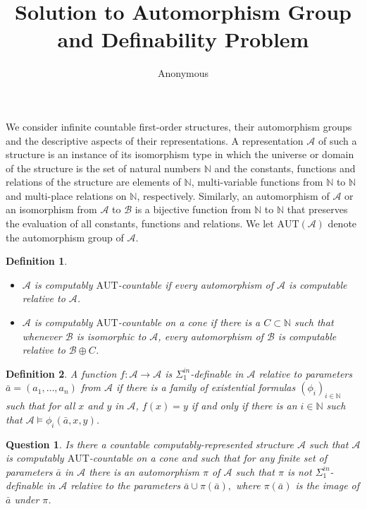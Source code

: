 \documentclass[12pt]{article}
\title{Solution to Automorphism Group and Definability Problem}
\author{Anonymous}
\date{}
\newcommand{\A}{\mathcal{A}}
\newcommand{\B}{\mathcal{B}}
\newcommand{\N}{\mathbb{N}}
\newcommand{\AUT}{\mathrm{AUT}}
\newtheorem{definition}{Definition}
\newtheorem{question}{Question}
\begin{document}
\maketitle

We consider infinite countable first-order structures, their automorphism groups and the descriptive aspects of their representations. A representation $\A$ of such a structure is an instance of its isomorphism type in which the universe or domain of the structure is the set of natural numbers $\N$ and the constants, functions and relations of the structure are elements of $\N$, multi-variable functions from $\N$ to $\N$ and multi-place relations on $\N$, respectively.   Similarly, an automorphism of $\A$ or an isomorphism from $\A$ to $\B$ is a bijective function from $\N$ to $\N$ that preserves the evaluation of all constants, functions and relations.  We let $\AUT(\A)$ denote the automorphism group of $\A$.

\begin{definition}\label{1.1}
  \begin{itemize}
  \item     $\A$ is \emph{computably $\AUT$-countable} if every automorphism of $\A$ is computable relative to $\A$.  
  \item  $\A$ is \emph{computably $\AUT$-countable on a cone} if there is a $C\subset\N$ such that whenever $\B$ is isomorphic to $\A$, every automorphism of $\B$ is computable relative to $\B\oplus C$.
  \end{itemize}
\end{definition}


\begin{definition}
  A function $f:\A\to\A$ is \emph{$\Sigma^{in}_1$-definable} in $\A$ relative to parameters
  $\bar{a}=(a_1,\dots,a_n)$ from $\A$ if there is a family of existential formulas $(\phi_i)_{i\in\N}$ such that for all $x$ and $y$ in $\A$, $f(x)=y$ if and only if there is an $i\in\N$ such that $\A\models\phi_i(\bar{a},x,y)$.
\end{definition}

\begin{question}\label{sec:question}\label{1.2}
  Is there a countable computably-represented structure $\A$ such that $\A$ is computably $\AUT$-countable on a cone and such that for any finite  set of parameters $\bar{a}$ in $\A$ there is an automorphism $\pi$ of $\A$ such that $\pi$ is not $\Sigma^{in}_1$-definable in $\A$ relative to the parameters $\bar{a}\cup \pi(\bar{a}),$ where $\pi(\bar{a})$ is the image of $\bar{a}$ under $\pi$.
\end{question}
\end{document}
